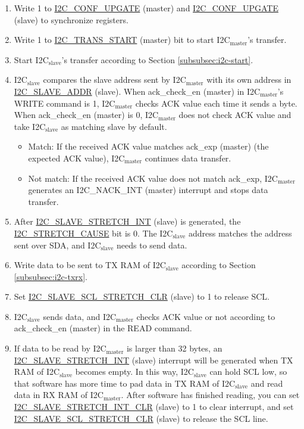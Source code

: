 \documentclass[main\_\_EN.tex]{subfiles}
\begin{document}
\begin{enumerate}
\item Write 1 to \hyperref[fielddesc:I2CCONFUPGATE]{I2C\_CONF\_UPGATE} (master) and \hyperref[fielddesc:I2CCONFUPGATE]{I2C\_CONF\_UPGATE} (slave) to synchronize registers.
\item Write 1 to \hyperref[fielddesc:I2CTRANSSTART]{I2C\_TRANS\_START} (master) bit to start I2C$_\text{master}$'s transfer.
\item Start I2C$_\text{slave}$'s transfer according to Section \ref{subsubsec:i2c-start}.
\item I2C$_\text{slave}$ compares the slave address sent by I2C$_\text{master}$ with its own address in \hyperref[fielddesc:I2CSLAVEADDR]{I2C\_SLAVE\_ADDR} (slave). When ack\_check\_en (master) in I2C$_\text{master}$'s WRITE command is 1, I2C$_\text{master}$ checks ACK value each time it sends a byte. When ack\_check\_en (master) is 0, I2C$_\text{master}$ does not check ACK value and take I2C$_\text{slave}$ as matching slave by default.
\begin{itemize}
\item Match: If the received ACK value matches ack\_exp (master) (the expected ACK value), I2C$_\text{master}$ continues data transfer.
\item Not match: If the received ACK value does not match ack\_exp, I2C$_\text{master}$ generates an I2C\_NACK\_INT (master) interrupt and stops data transfer.
\end{itemize}

\item After \hyperref[int:i2c-slave-stretch]{I2C\_SLAVE\_STRETCH\_INT} (slave) is generated, the \hyperref[fielddesc:I2CSTRETCHCAUSE]{I2C\_STRETCH\_CAUSE} bit is 0. The I2C$_\text{slave}$ address matches the address sent over SDA, and I2C$_\text{slave}$ needs to send data.
\item Write data to be sent to TX RAM of I2C$_\text{slave}$ according to Section \ref{subsubsec:i2c-txrx}.
\item Set \hyperref[fielddesc:I2CSLAVESCLSTRETCHCLR]{I2C\_SLAVE\_SCL\_STRETCH\_CLR} (slave) to 1 to release SCL.

\item I2C$_\text{slave}$ sends data, and I2C$_\text{master}$ checks ACK value or not according to ack\_check\_en (master) in the READ command.

\item If data to be read by I2C$_\text{master}$ is larger than 32 bytes, an \hyperref[int:i2c-slave-stretch]{I2C\_SLAVE\_STRETCH\_INT} (slave) interrupt will be generated when TX RAM of I2C$_\text{slave}$ becomes empty. In this way, I2C$_\text{slave}$ can hold SCL low, so that software has more time to pad data in TX RAM of I2C$_\text{slave}$ and read data in RX RAM of I2C$_\text{master}$. After software has finished reading, you can set \hyperref[fielddesc:I2CSLAVESTRETCHINTCLR]{I2C\_SLAVE\_STRETCH\_INT\_CLR} (slave) to 1 to clear interrupt, and set \hyperref[fielddesc:I2CSLAVESCLSTRETCHCLR]{I2C\_SLAVE\_SCL\_STRETCH\_CLR} (slave) to release the SCL line.


\end{enumerate}
\end{document}
